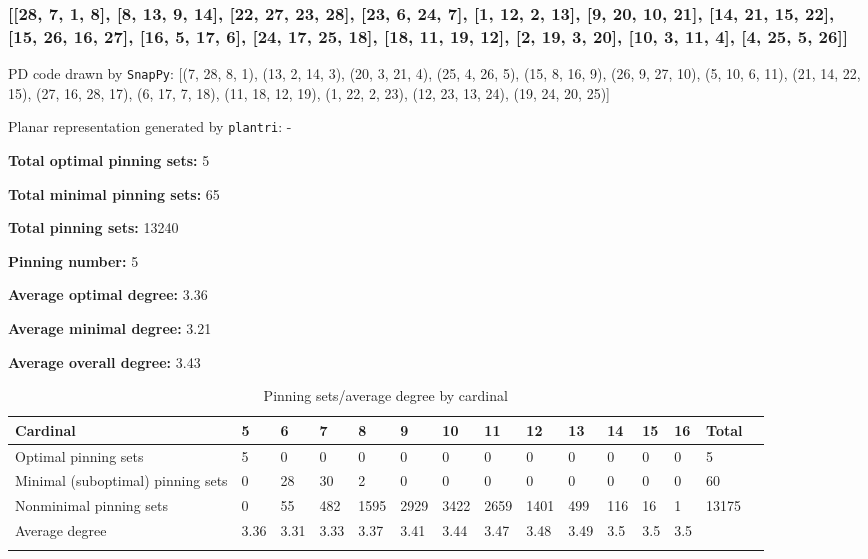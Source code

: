 \documentclass{article}%
\begin{document}
\newpage

\subsubsection{[[28, 7, 1, 8], [8, 13, 9, 14], [22, 27, 23, 28], [23, 6, 24, 7], [1, 12, 2, 13], [9, 20, 10, 21], [14, 21, 15, 22], [15, 26, 16, 27], [16, 5, 17, 6], [24, 17, 25, 18], [18, 11, 19, 12], [2, 19, 3, 20], [10, 3, 11, 4], [4, 25, 5, 26]]}

{\small\noindent PD code drawn by \texttt{SnapPy}: [(7, 28, 8, 1), (13, 2, 14, 3), (20, 3, 21, 4), (25, 4, 26, 5), (15, 8, 16, 9), (26, 9, 27, 10), (5, 10, 6, 11), (21, 14, 22, 15), (27, 16, 28, 17), (6, 17, 7, 18), (11, 18, 12, 19), (1, 22, 2, 23), (12, 23, 13, 24), (19, 24, 20, 25)]}

{\small\noindent Planar representation generated by \texttt{plantri}: -}

\begin{multicols}{2}
{\normalsize \noindent\textbf{Total optimal pinning sets:} 5

\noindent\textbf{Total minimal pinning sets:} 65

\noindent\textbf{Total pinning sets:} 13240

\noindent\textbf{Pinning number:} 5

}
\columnbreak

{\normalsize \noindent\textbf{Average optimal degree:} 3.36

\noindent\textbf{Average minimal degree:} 3.21

\noindent\textbf{Average overall degree:} 3.43

}
\end{multicols}

\begin{table}[ht]
	\caption{Pinning sets/average degree by cardinal}
	\centering
	\renewcommand{\arraystretch}{1.5}
	\begin{tabularx}{\textwidth}{lXXXXXXXXXXXXXX}
		\toprule
			Cardinal & 5 & 6 & 7 & 8 & 9 & 10 & 11 & 12 & 13 & 14 & 15 & 16 & Total\\
			\hline
			Optimal pinning sets & 5 & 0 & 0 & 0 & 0 & 0 & 0 & 0 & 0 & 0 & 0 & 0 & 5 \\
			Minimal (suboptimal) pinning sets & 0 & 28 & 30 & 2 & 0 & 0 & 0 & 0 & 0 & 0 & 0 & 0 & 60 \\
			Nonminimal pinning sets & 0 & 55 & 482 & 1595 & 2929 & 3422 & 2659 & 1401 & 499 & 116 & 16 & 1 & 13175 \\
			Average degree & 3.36 & 3.31 & 3.33 & 3.37 & 3.41 & 3.44 & 3.47 & 3.48 & 3.49 & 3.5 & 3.5 & 3.5 &  \\
		\bottomrule \\ 
	\end{tabularx}
\end{table}
\end{document}
